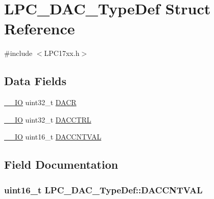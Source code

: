 \hypertarget{structLPC__DAC__TypeDef}{}\section{L\+P\+C\+\_\+\+D\+A\+C\+\_\+\+Type\+Def Struct Reference}
\label{structLPC__DAC__TypeDef}


{\ttfamily \#include $<$L\+P\+C17xx.\+h$>$}

\subsection*{Data Fields}
\begin{DoxyCompactItemize}
\item 
\hyperlink{LPC17xx_8h_aec43007d9998a0a0e01faede4133d6be}{\+\_\+\+\_\+\+IO} uint32\+\_\+t \hyperlink{structLPC__DAC__TypeDef_aeca5925957d02f483828953f108d8472}{D\+A\+CR}
\item 
\hyperlink{LPC17xx_8h_aec43007d9998a0a0e01faede4133d6be}{\+\_\+\+\_\+\+IO} uint32\+\_\+t \hyperlink{structLPC__DAC__TypeDef_a98d077f22452e939c5393ba58460165d}{D\+A\+C\+C\+T\+RL}
\item 
\hyperlink{LPC17xx_8h_aec43007d9998a0a0e01faede4133d6be}{\+\_\+\+\_\+\+IO} uint16\+\_\+t \hyperlink{structLPC__DAC__TypeDef_ae31627b66bf9b21cdfd825b81d65b252}{D\+A\+C\+C\+N\+T\+V\+AL}
\end{DoxyCompactItemize}


\subsection{Field Documentation}
\subsubsection[{\texorpdfstring{D\+A\+C\+C\+N\+T\+V\+AL}{DACCNTVAL}}]{ uint16\+\_\+t L\+P\+C\+\_\+\+D\+A\+C\+\_\+\+Type\+Def\+::\+D\+A\+C\+C\+N\+T\+V\+AL}\hypertarget{structLPC__DAC__TypeDef_ae31627b66bf9b21cdfd825b81d65b252}{}\label{structLPC__DAC__TypeDef_ae31627b66bf9b21cdfd825b81d65b252}
